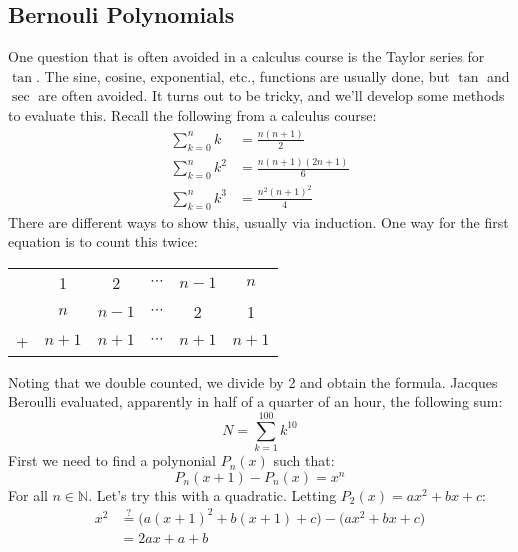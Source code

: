 \documentclass[crop=false,class=book,oneside]{standalone}
\begin{document}
        \subsection{Bernouli Polynomials}
            One question that is often avoided in a calculus course
            is the Taylor series for $\tan$. The sine, cosine,
            exponential, etc., functions are usually done, but
            $\tan$ and $\sec$ are often avoided. It turns out to be
            tricky, and we'll develop some methods to evaluate this.
            Recall the following from a calculus course:
            \begin{align}
                \sum_{k=0}^{n}k&=\frac{n(n+1)}{2}\\
                \sum_{k=0}^{n}k^{2}&=
                \frac{n(n+1)(2n+1)}{6}\\
                \sum_{k=0}^{n}k^{3}&=\frac{n^{2}(n+1)^{2}}{4}
            \end{align}
            There are different ways to show this, usually via
            induction. One way for the first equation is to count
            this twice:
            \begin{table}[]
                \centering
                \begin{tabular}{cc|c|c|c|c}
                    &1&2&$\cdots$&$n-1$&$n$\\
                    &$n$&$n-1$&$\cdots$&2&1\\
                    \hline
                    +&$n+1$&$n+1$&$\cdots$&$n+1$&$n+1$
                \end{tabular}
            \end{table}
            Noting that we double counted, we divide by 2 and
            obtain the formula.
            Jacques Beroulli evaluated, apparently in half of a
            quarter of an hour, the following sum:
            \begin{equation}
                N=\sum_{k=1}^{100}k^{10}
            \end{equation}
            First we need to find a polynonial $P_{n}(x)$ such that:
            \begin{equation}
                P_{n}(x+1)-P_{n}(x)=x^{n}
            \end{equation}
            For all $n\in\mathbb{N}$. Let's try this with a
            quadratic. Letting $P_{2}(x)=ax^{2}+bx+c$:
            \begin{align}
                x^{2}&\overset{\textrm{?}}{=}
                \big(a(x+1)^{2}+b(x+1)+c\big)-
                \big(ax^{2}+bx+c\big)\\
                &=2ax+a+b
            \end{align}
\end{document}
